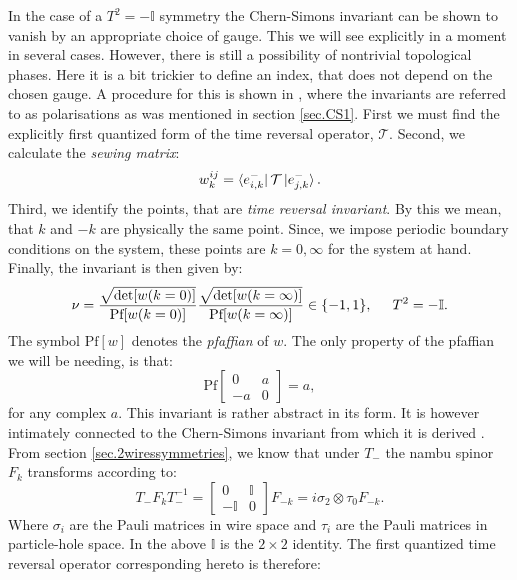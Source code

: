 In the case of a $T^2 = - \mathbb{I}$ symmetry the Chern-Simons invariant can be shown to vanish by an appropriate choice of gauge. This we will see explicitly in a moment in several cases. However, there is still a possibility of nontrivial topological phases. Here it is a bit trickier to define an index, that does not depend on the chosen gauge. A procedure for this is shown in \cite{FuKane2006}, where the invariants are referred to as polarisations as was mentioned in section \ref{sec.CS1}. First we must find the explicitly first quantized form of the time reversal operator, $\mathcal{T}$. Second, we calculate the \textit{sewing matrix}:
\begin{equation}
w^{ij}_k = \bra{e^{-}_{i,k}}\mathcal{T}\ket{e^{-}_{j,k}}.
\label{eq.2wires_sewingmatrix}
\end{equation}
Third, we identify the points, that are \textit{time reversal invariant}. By this we mean, that $k$ and $-k$ are physically the same point. Since, we impose periodic boundary conditions on the system, these points are $k = 0, \infty$ for the system at hand. Finally, the invariant is then given by: 
\begin{equation}
\nu = \frac{\sqrt{\det[w(k=0)]}}{\text{Pf}[w(k=0)]} \frac{\sqrt{\det[w(k=\infty)]}}{\text{Pf}[w(k=\infty)]} \in \{-1,1\}, \hspace{0.5cm} T^2 = -\mathbb{I}.
\label{eq.2wirestopindexT2eq-1}
\end{equation}
The symbol $\text{Pf}[w]$ denotes the \textit{pfaffian} of $w$. The only property of the pfaffian we will be needing, is that:
\begin{equation}
\text{Pf}\begin{bmatrix} 0 & a \\ -a & 0 \end{bmatrix} = a, \nonumber
\end{equation}
for any complex $a$. This invariant is rather abstract in its form. It is however intimately connected to the Chern-Simons invariant from which it is derived \cite{FuKane2006}. From section \ref{sec.2wiressymmetries}, we know that under $T_-$ the nambu spinor $F_k$ transforms according to:
\begin{equation}
T_- F_k T^{-1}_- = \begin{bmatrix} 0 & \mathbb{I} \\ -\mathbb{I} & 0 \end{bmatrix}F_{-k} = i\sigma_2\otimes \tau_0 F_{-k}. \nonumber
\end{equation}
Where $\sigma_i$ are the Pauli matrices in wire space and $\tau_i$ are the Pauli matrices in particle-hole space. In the above $\mathbb{I}$ is the $2 \times 2$ identity. The first quantized time reversal operator corresponding hereto is therefore:
